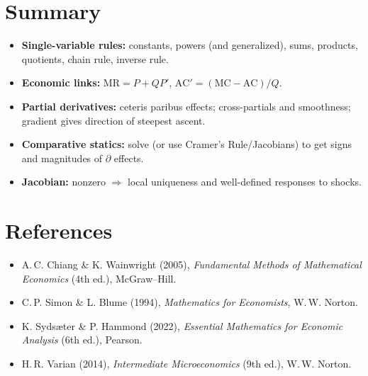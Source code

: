 \documentclass[11pt]{article}
\begin{document}
\section*{Summary}
\begin{itemize}
\item \textbf{Single-variable rules:} constants, powers (and generalized), sums, products, quotients, chain rule, inverse rule.
\item \textbf{Economic links:} $\mathrm{MR}=P+Q P'$, $\mathrm{AC}'=(\mathrm{MC}-\mathrm{AC})/Q$.
\item \textbf{Partial derivatives:} ceteris paribus effects; cross-partials and smoothness; gradient gives direction of steepest ascent.
\item \textbf{Comparative statics:} solve (or use Cramer's Rule/Jacobians) to get signs and magnitudes of $\partial$ effects.
\item \textbf{Jacobian:} nonzero $\Rightarrow$ local uniqueness and well-defined responses to shocks.
\end{itemize}



\newpage
\section*{References}
\begin{itemize}
\item A.\,C. Chiang \& K. Wainwright (2005), \textit{Fundamental Methods of Mathematical Economics} (4th ed.), McGraw--Hill.
\item C.\,P. Simon \& L. Blume (1994), \textit{Mathematics for Economists}, W.\,W. Norton.
\item K. Syds\ae ter \& P. Hammond (2022), \textit{Essential Mathematics for Economic Analysis} (6th ed.), Pearson.
\item H.\,R. Varian (2014), \textit{Intermediate Microeconomics} (9th ed.), W.\,W. Norton.
\end{itemize}
\end{document}
